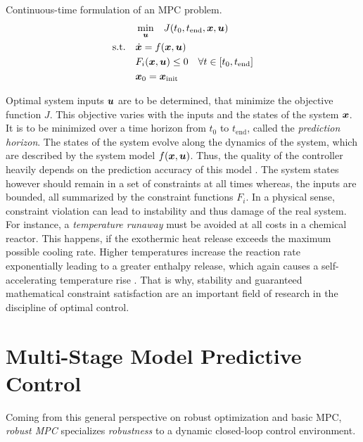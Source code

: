 \begin{definition} Continuous-time formulation of an MPC problem.
    \label{theory:def: general mpc}
    \[
        \begin{gathered}
            \underset{{\bm{u}}}{\min} \quad  J(t_0, t_\text{end}, {\bm{x}}, {\bm{u}}) \\
            \begin{aligned}
                \text{s.t.} \quad &\dot{{\bm{x}}} = f({\bm{x}}, {\bm{u}}) \\
                & F_i({\bm{x}}, {\bm{u}}) \leq 0 \quad \forall t \in [t_0, t_\text{end}] \\
                & {\bm{x}}_0 = {\bm{x}}_\text{init}
            \end{aligned}
        \end{gathered}
    \]
\end{definition}

\noindent
Optimal system inputs ${\bm{u}}$ are to be determined, that minimize the objective function $J$. This objective
varies with the inputs and the states of the system ${\bm{x}}$. It is to be minimized over a time horizon
from $t_0$ to $t_\text{end}$, called the \emph{prediction horizon}. The states of the system evolve along
the dynamics of the system, which are described by the system model $f({\bm{x}}, {\bm{u}})$. Thus, the quality
of the controller heavily depends on the prediction accuracy of this model \cite{lucia2013}.
The system states however should remain in a set of constraints at all times whereas, the inputs
are bounded, all summarized by the constraint  functions $F_i$. In a physical sense, constraint violation can lead to 
instability and thus damage of the real system.
For instance, a \emph{temperature runaway} must be avoided at all costs in a chemical reactor.
This happens, if the exothermic heat release exceeds the maximum possible
cooling rate. Higher temperatures increase the reaction rate exponentially leading to a greater 
enthalpy release, which again causes a self-accelerating temperature rise \cite{guttel2021}. 
That is why, stability and guaranteed mathematical constraint satisfaction
are an important field of research in the discipline of optimal control.


\section{Multi-Stage Model Predictive Control}

Coming from this general perspective on robust optimization and basic MPC, \emph{robust MPC} specializes
\emph{robustness} to a dynamic closed-loop control environment. 

